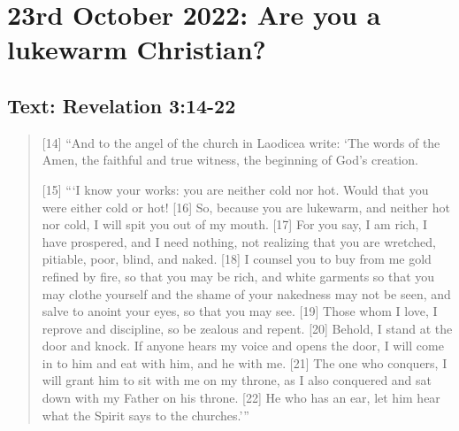 \section{23rd October 2022: Are you a lukewarm Christian?}
\subsection*{Text: Revelation 3:14-22}
  \begin{quote}
    [14] “And to the angel of the church in Laodicea write: ‘The words of the Amen, the faithful and true witness, the beginning of God’s creation.

    [15] “‘I know your works: you are neither cold nor hot. Would that you were either cold or hot! [16] So, because you are lukewarm, and neither hot nor cold, I will spit you out of my mouth. [17] For you say, I am rich, I have prospered, and I need nothing, not realizing that you are wretched, pitiable, poor, blind, and naked. [18] I counsel you to buy from me gold refined by fire, so that you may be rich, and white garments so that you may clothe yourself and the shame of your nakedness may not be seen, and salve to anoint your eyes, so that you may see. [19] Those whom I love, I reprove and discipline, so be zealous and repent. [20] Behold, I stand at the door and knock. If anyone hears my voice and opens the door, I will come in to him and eat with him, and he with me. [21] The one who conquers, I will grant him to sit with me on my throne, as I also conquered and sat down with my Father on his throne. [22] He who has an ear, let him hear what the Spirit says to the churches.’”
  \end{quote}
